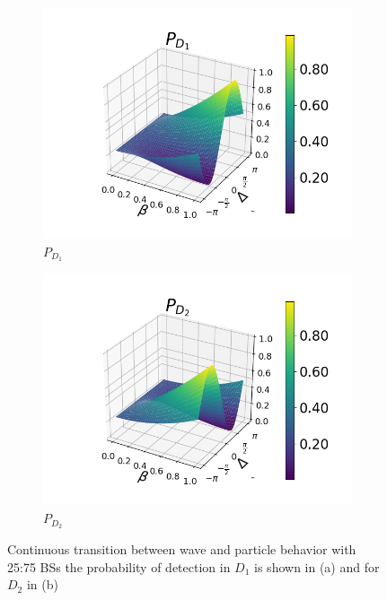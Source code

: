 \documentclass[12pt]{book}
\begin{document}
\begin{figure}[H]
\centering
\begin{subfigure}[b]{0.40\linewidth}
\includegraphics[width=\linewidth]{images/pd1_2_pi3.png}
\caption{$P_{D_{1}}$}
\end{subfigure}
\begin{subfigure}[b]{0.40\linewidth}
\includegraphics[width=\linewidth]{images/pd2_2_pi3.png}
\caption{$P_{D_{2}}$ }
\label{fig:BS1}
\end{subfigure}
\caption{Continuous transition between wave and particle behavior with 25:75 BSs the probability of detection in $D_{1}$ is shown in (a) and for $D_{2}$ in (b)}
\label{pi/3}
\end{figure}
\end{document}
